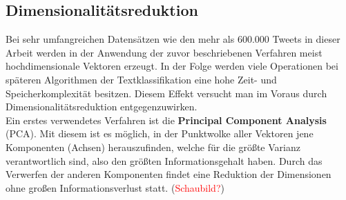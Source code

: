 \subsection{Dimensionalitätsreduktion}
Bei sehr umfangreichen Datensätzen wie den mehr als 600.000 Tweets in dieser Arbeit werden in der Anwendung der zuvor beschriebenen Verfahren meist hochdimensionale Vektoren erzeugt. In der Folge werden viele Operationen bei späteren Algorithmen der Textklassifikation eine hohe Zeit- und Speicherkomplexität besitzen. Diesem Effekt versucht man im Voraus durch Dimensionalitätsreduktion entgegenzuwirken.\\
Ein erstes verwendetes Verfahren ist die \textbf{Principal Component Analysis} (PCA). Mit diesem ist es möglich, in der Punktwolke aller Vektoren jene Komponenten (Achsen) herauszufinden, welche für die größte Varianz verantwortlich sind, also  den größten Informationsgehalt haben. Durch das Verwerfen der anderen Komponenten findet eine Reduktion der Dimensionen ohne großen Informationsverlust statt. (\textcolor{red}{Schaubild?})